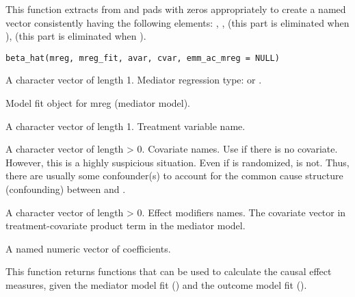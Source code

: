 \documentclass[a4paper]{book}
\begin{document}
%
\begin{Description}
This function extracts  from  and pads with zeros appropriately to create a named vector consistently having the following elements:
,
,
 (this part is eliminated when ),
 (this part is eliminated when ).
\end{Description}
%
\begin{Usage}
\begin{verbatim}
beta_hat(mreg, mreg_fit, avar, cvar, emm_ac_mreg = NULL)
\end{verbatim}
\end{Usage}
%
\begin{Arguments}
\begin{ldescription}
\item[\code{mreg}] A character vector of length 1. Mediator regression type:  or .

\item[\code{mreg\_fit}] Model fit object for mreg (mediator model).

\item[\code{avar}] A character vector of length 1. Treatment variable name.

\item[\code{cvar}] A character vector of length > 0. Covariate names. Use  if there is no covariate. However, this is a highly suspicious situation. Even if  is randomized,  is not. Thus, there are usually some confounder(s) to account for the common cause structure (confounding) between  and .

\item[\code{emm\_ac\_mreg}] A character vector of length > 0. Effect modifiers names. The covariate vector in treatment-covariate product term in the mediator model.
\end{ldescription}
\end{Arguments}
%
\begin{Value}
A named numeric vector of coefficients.
\end{Value}
%
\begin{Description}
This function returns functions that can be used to calculate the causal effect measures, given the mediator model fit () and the outcome model fit ().
\end{Description}
\end{document}
